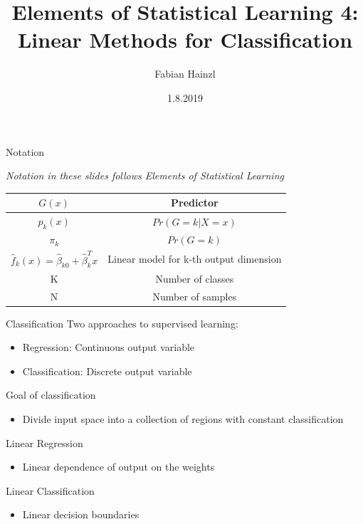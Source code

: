 \documentclass{beamer}
\title[Linear Classification]{Elements of Statistical Learning 4: \\
Linear Methods for Classification}
\author{Fabian Hainzl}
\institute{appliedAI}
\date{1.8.2019}
\begin{document}
\begin{frame}
  \titlepage
\end{frame}


\begin{frame}{Notation}

{\small \textit{Notation in these slides follows Elements of Statistical Learning}}
\vspace{0.5cm}
\begin{tabular}{|c|c|}
\hline
$G(x)$ & Predictor \\
\hline
$p_k(x)$ & $Pr(G=k|X=x)$ \\
\hline
$\pi_k$ & $Pr(G=k)$ \\
\hline
$\hat{f}_k(x) = \hat{\beta}_{k0}+\hat{\beta}_k^Tx$ & Linear model for k-th output dimension \\
\hline
K & Number of classes \\
\hline
N & Number of samples \\
\hline
\end{tabular}
\end{frame}

\begin{frame}{Classification}
Two approaches to supervised learning:
\begin{itemize}
\item Regression: Continuous output variable
\item Classification: Discrete output variable
\end{itemize}
\vspace{0.5cm}
Goal of classification
\begin{itemize}
\item Divide input space into a collection of regions with constant classification
\end{itemize}
\vspace{0.5cm}
Linear Regression
\begin{itemize}
\item Linear dependence of output on the weights
\end{itemize}
\vspace{0.5cm}
Linear Classification
\begin{itemize}
\item Linear decision boundaries
\end{itemize}

\end{frame}
\end{document}
